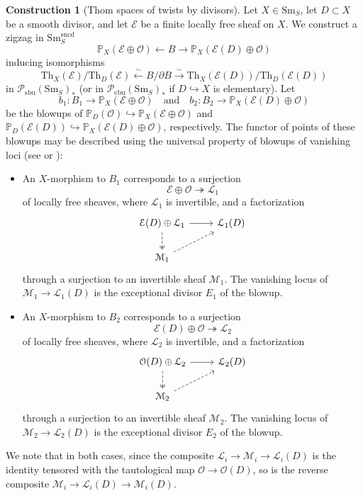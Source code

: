 \documentclass{amsart}
\numberwithin{equation}{section}
\theoremstyle{plain}
\theoremstyle{definition}
\newtheorem{construction}[equation]{Construction}
\let\scr=\mathcal
\let\bb=\mathbb
\def\P{\bb P}
\let\into=\hookrightarrow
\let\onto=\twoheadrightarrow
\def\Th{\mathrm{Th}}
\let\cat=\mathrm
\def\Sm{{\cat{S}\mathrm{m}}}
\def\sbu{\mathrm{sbu}}
\def\ebu{\mathrm{ebu}}
\def\sncd{\mathrm{sncd}}
\begin{document}
\begin{construction}[Thom spaces of twists by divisors]
	\label{ctr:thomtwist}
Let $X \in \Sm_S$, let $D\subset X$ be a smooth divisor, and let $\scr E$ be a finite locally free sheaf on $X$.
We construct a zigzag in $\Sm_S^\sncd$ \cite[Definition 2.4]{AHI}
\begin{equation*}
\P_X(\scr E \oplus \scr O) \leftarrow B \rightarrow \P_X(\scr E(D) \oplus \scr O)
\end{equation*}
inducing isomorphisms
\begin{equation*}
\Th_X(\scr E) / \Th_D(\scr E) \xleftarrow{\sim} B/\partial B \xrightarrow{\sim} \Th_X(\scr E(D)) / \Th_D(\scr E(D))
\end{equation*}
in $\scr P_{\sbu}(\Sm_S)_*$ (or in $\scr P_{\ebu}(\Sm_S)_*$ if $D\into X$ is elementary).
Let 
\[
b_1\colon B_1 \to \P_X(\scr E \oplus \scr O) \quad\text{and} \quad  b_2\colon B_2 \to \P_X(\scr E(D) \oplus \scr O)
\]
be the blowups of $\P_D(\scr O) \into \P_X(\scr E \oplus \scr O)$ and $\P_D(\scr E(D)) \into \P_X(\scr E(D) \oplus \scr O)$, respectively. The functor of points of these blowups may be described using the universal property of blowups of vanishing loci (see \cite[Theorem 122]{AnnalaThesis} or \cite[Lemma 3.2]{AHI}):
\begin{itemize}
\item An $X$-morphism to $B_1$ corresponds to a surjection
\[
\scr E \oplus \scr O \onto \scr L_1
\]
of locally free sheaves, where $\scr L_1$ is invertible, and a factorization 
\[
\begin{tikzcd}
\scr E(D) \oplus \scr L_1 \arrow[r] \arrow[d,twoheadrightarrow,dashed] & \scr L_1(D) \\
\scr M_1 \ar[dashed]{ur}
\end{tikzcd}
\]
through a surjection to an invertible sheaf $\scr M_1$. The vanishing locus of $\scr M_1\to\scr L_1(D)$ is the exceptional divisor $E_1$ of the blowup.

\item An $X$-morphism to $B_2$ corresponds to a surjection
\[
\scr E(D) \oplus \scr O \onto \scr L_2
\]
of locally free sheaves, where $\scr L_2$ is invertible, and a factorization 
\[
\begin{tikzcd}
\scr O(D) \oplus \scr L_2 \arrow[r] \arrow[d,twoheadrightarrow,dashed] & \scr L_2(D) \\
\scr M_2 \ar[dashed]{ur}
\end{tikzcd}
\]
through a surjection to an invertible sheaf $\scr M_2$. The vanishing locus of $\scr M_2\to\scr L_2(D)$ is the exceptional divisor $E_2$ of the blowup.
\end{itemize}
We note that in both cases, since the composite $\scr L_i\to\scr M_i\to\scr L_i(D)$ is the identity tensored with the tautological map $\scr O\to\scr O(D)$, so is the reverse composite $\scr M_i\to\scr L_i(D)\to\scr M_i(D)$.


\end{construction}
\end{document}
